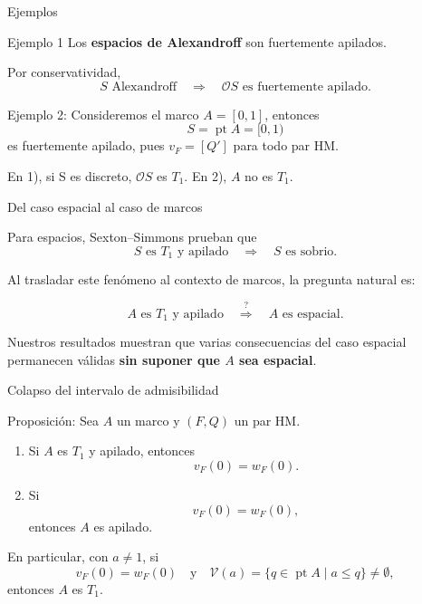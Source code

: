 \documentclass[compress,12pt]{beamer}
\DeclareMathOperator{\pt}{pt}
\begin{document}
\begin{frame}{Ejemplos}

\begin{block}{Ejemplo 1}
Los \textbf{espacios de Alexandroff} son fuertemente apilados.

Por conservatividad,
\[
    S \text{ Alexandroff}
    \quad\Longrightarrow\quad
    \mathcal{O}S \text{ es fuertemente apilado}.
\]
\end{block}

\begin{block}{Ejemplo 2:}
Consideremos el marco $A=[0,1]$, entonces
\[
S=\pt A=[0,1)
\]
es fuertemente apilado, pues $v_F=[Q']$ para todo par HM.
\end{block}

\alert{En 1), si S es discreto, $\mathcal{O}S$ es $T_1$. En 2), $A$ no es $T_1$.}
\end{frame}

\begin{frame}{Del caso espacial al caso de marcos}

Para espacios, Sexton--Simmons prueban que
\[
    \boxed{
    S\text{ es }T_1\text{ y apilado}
    \quad\Longrightarrow\quad
    S\text{ es sobrio}.
    }
\]

\vspace{0.5cm}

Al trasladar este fenómeno al contexto de marcos,
la pregunta natural es:

\[
    \boxed{
    A\text{ es }T_1\text{ y apilado}
    \quad\stackrel{?}{\Longrightarrow}\quad
    A\text{ es espacial}.
    }
\]

\vspace{0.5cm}

Nuestros resultados muestran que varias consecuencias
del caso espacial permanecen válidas
\textbf{sin suponer que \(A\) sea espacial}.

\end{frame}

\begin{frame}{Colapso del intervalo de admisibilidad}

\begin{block}{Proposición:}
Sea \(A\) un marco y \((F,Q)\) un par HM.

\begin{enumerate}
    \item Si \(A\) es \(T_1\) y apilado, entonces
    \[
        \boxed{v_F(0)=w_F(0)}.
    \]

    \item Si
    \[
        v_F(0)=w_F(0),
    \]
    entonces \(A\) es apilado.
\end{enumerate}
\end{block}

En particular, con $a\neq 1$, si 
\[
    v_F(0)=w_F(0)\quad \text{y}\quad \mathcal{V}(a)=\{q\in\operatorname{pt}A\mid a\leq q\}\neq \emptyset,
\]
entonces $A$ es $T_1$.
\end{frame}
\end{document}
